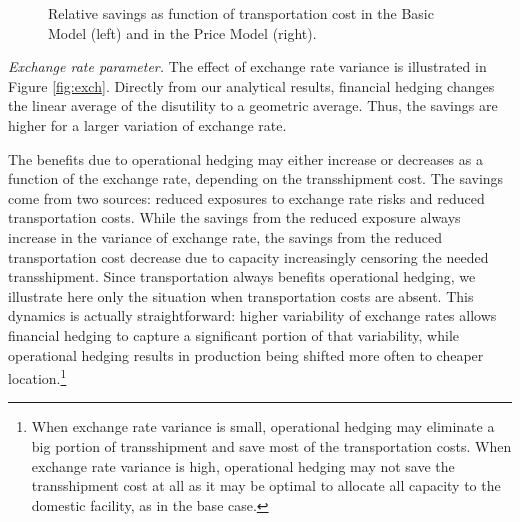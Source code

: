 \documentclass[mnsc,nonblindrev,copyedit]{informs2_wz} %
\begin{document}
\begin{figure}[ht]
\begin{center}
\begin{minipage}{6in}
    \begin{minipage}{3.1in}
        \epsfxsize=2.8in
    \hspace{-0.0in}    
    \end{minipage}
    \begin{minipage}{2.8in}
        \epsfxsize=2.8in
    \hspace{-0.0in}    
    \end{minipage}
\end{minipage}
\vspace{.05in} \caption{Relative savings as function of
transportation cost in the Basic Model (left) and in the Price Model (right).} \label{fig:trans} \vspace{-.2in}
\end{center}
\end{figure}



{\noindent \em Exchange rate parameter.} The effect of exchange rate variance is illustrated in Figure \ref{fig:exch}.  Directly from our analytical results, financial hedging changes the linear average of the disutility to a geometric average.  Thus, the savings are higher for a larger variation of exchange rate.

The benefits due to operational hedging may either increase or decreases as a function of the exchange rate, depending on the transshipment cost.  The savings come from two sources: reduced exposures to exchange rate risks and reduced transportation costs.  While the savings from the reduced exposure always increase in the variance of exchange rate, the savings from the reduced transportation cost decrease due to capacity increasingly censoring the needed transshipment.  Since transportation always benefits operational hedging, we illustrate here only the situation when transportation costs are absent.  This dynamics is actually straightforward: higher variability of exchange rates allows financial hedging to capture a significant portion of that variability, while operational hedging results in production being shifted more often to cheaper location.\footnote{When exchange rate variance is small, operational hedging may eliminate a big portion of transshipment and save most of the transportation costs.  When exchange rate variance is high, operational hedging may not save the transshipment cost at all as it may be optimal to allocate all capacity to the domestic facility, as in the base case.}
\end{document}
